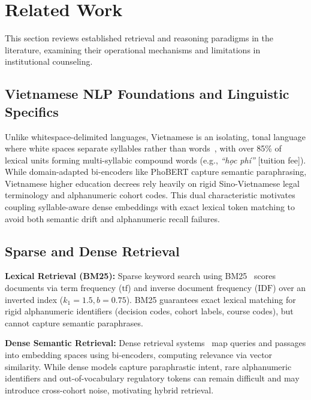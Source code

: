 \section{Related Work}
\label{sec:related}

This section reviews established retrieval and reasoning paradigms in the literature, examining their operational mechanisms and limitations in institutional counseling.

\subsection{Vietnamese NLP Foundations and Linguistic Specifics}
\label{sec:vietnamese_nlp}

Unlike whitespace-delimited languages, Vietnamese is an isolating, tonal language where white spaces separate syllables rather than words~\cite{nguyen2020phobert}, with over 85\% of lexical units forming multi-syllabic compound words (e.g., \textit{``h\d{o}c ph\'i''} [tuition fee]). While domain-adapted bi-encoders like PhoBERT capture semantic paraphrasing, Vietnamese higher education decrees rely heavily on rigid Sino-Vietnamese legal terminology and alphanumeric cohort codes. This dual characteristic motivates coupling syllable-aware dense embeddings with exact lexical token matching to avoid both semantic drift and alphanumeric recall failures.

\subsection{Sparse and Dense Retrieval}
\label{sec:sparse_dense}

\textbf{Lexical Retrieval (BM25):} Sparse keyword search using BM25~\cite{robertson2009bm25} scores documents via term frequency ($\mathrm{tf}$) and inverse document frequency ($\mathrm{IDF}$) over an inverted index ($k_1 = 1.5, b = 0.75$). BM25 guarantees exact lexical matching for rigid alphanumeric identifiers (decision codes, cohort labels, course codes), but cannot capture semantic paraphrases.

\textbf{Dense Semantic Retrieval:} Dense retrieval systems~\cite{karpukhin2020dpr,lewis2020rag} map queries and passages into embedding spaces using bi-encoders, computing relevance via vector similarity. While dense models capture paraphrastic intent, rare alphanumeric identifiers and out-of-vocabulary regulatory tokens can remain difficult and may introduce cross-cohort noise, motivating hybrid retrieval.

